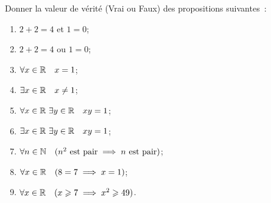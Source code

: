 \begin{exercice}
  Donner la valeur de vérité (Vrai ou Faux) des propositions suivantes~:
  \begin{enumerate}
    \item \(2+2=4\) et \(1=0\);
    \item \(2+2=4\) ou \(1=0\);
    \item \(\forall x \in \mathbb{R} \quad x=1\);
    \item \(\exists x \in \mathbb{R} \quad x\neq 1\);
    \item \(\forall x \in \mathbb{R} \ \exists y \in \mathbb{R} \quad xy=1\);
    \item \(\exists x \in \mathbb{R} \ \exists y \in \mathbb{R} \quad xy=1\);
    \item \(\forall n \in \mathbb{N} \quad (n^2 \textrm{~est pair} \implies n
      \textrm{~est pair})\);
    \item \(\forall x \in \mathbb{R} \quad (8=7 \implies x=1)\);
    \item \(\forall x \in \mathbb{R} \quad (x \geqslant 7 \implies x^2 \geqslant 49)\).
  \end{enumerate}
\end{exercice}

